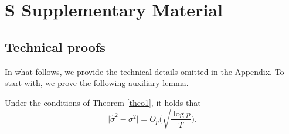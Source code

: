 \documentclass[a4paper,12pt]{article}
\numberwithin{equation}{section}
\begin{document}
\newpage
\section*{S \hspace{0.2cm} Supplementary Material}
\def\theequation{S.\arabic{equation}}
\setcounter{equation}{0}
\renewcommand{\thesubsection}{S.\arabic{subsection}}
\setcounter{subsection}{0}
\subsection{Technical proofs}

In what follows, we provide the technical details omitted in the Appendix. To start with, we prove the following auxiliary lemma.
\begin{lemmaS}\label{lemmaS1}
Under the conditions of Theorem \ref{theo1}, it holds that 
\[ \big| \hat{\sigma}^2 - \sigma^2 \big| = O_p\Big( \sqrt{\frac{\log p}{T}} \Big). \]
\end{lemmaS} 
\end{document}
